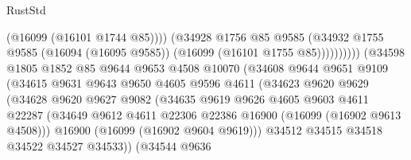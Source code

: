 \begin{lexlean}{RustStd}
\begin{coremodule}
                                          (@16099 (@16101 @1744 @85))))
                                      (@34928
                                        @1756
                                        @85
                                        @9585
                                        (@34932
                                          @1755
                                          @9585
                                          (@16094 (@16095 @9585))
                                          (@16099 (@16101 @1755 @85))))))))))
                          (@34598
                            @1805
                            @1852
                            @85
                            @9644
                            @9653
                            @4508
                            @10070
                            (@34608
                              @9644
                              @9651
                              @9109
                              (@34615
                                @9631
                                @9643
                                @9650
                                @4605
                                @9596
                                @4611
                                (@34623
                                  @9620
                                  @9629
                                  (@34628
                                    @9620
                                    @9627
                                    @9082
                                    (@34635
                                      @9619
                                      @9626
                                      @4605
                                      @9603
                                      @4611
                                      @22287
                                      (@34649
                                        @9612
                                        @4611
                                        @22306
                                        @22386
                                        @16900
                                        (@16099 (@16902 @9613 @4508)))
                                      @16900
                                      (@16099 (@16902 @9604 @9619)))
                                    @34512
                                    @34515
                                    @34518
                                    @34522
                                    @34527
                                    @34533))
                                (@34544
                                  @9636

\end{coremodule}
\end{lexlean}
